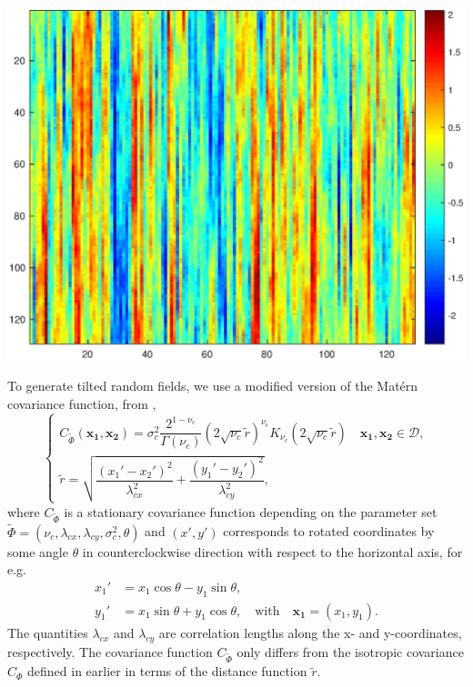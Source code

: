 \documentclass{extarticle}
\begin{document}
\includegraphics[scale=0.4]{f3.eps}\\
\vspace{1cm}

To generate tilted random fields, we use a modified version of the Mat\'ern covariance function, from \cite{kumarTransport},
\begin{equation}\label{aniso}
\begin{cases}
C_{\widetilde{\Phi}}(\mathbf{x_1},\mathbf{x_2}) = \sigma_c^2\dfrac{2^{1-\nu_c}}{\Gamma(\nu_c)}\left( 2\sqrt{\nu_c}\tilde{r}\right)^{\nu_c} K_{\nu_c}\left( 2\sqrt{\nu_c}\tilde{r}\right)\quad \mathbf{x_1},\mathbf{x_2}\in\mathcal{D},\\ 
\tilde{r} = \sqrt{\dfrac{(x_1'-x_2')^2}{\lambda^2_{cx}}+ \dfrac{(y_1'-y_2')^2}{\lambda^2_{cy}}},
\end{cases}
\end{equation}
where $C_{\widetilde{\Phi}}$ is a stationary covariance function depending on the parameter set ${\widetilde{\Phi}} = (\nu_c, \lambda_{cx}, \lambda_{cy}, \sigma_c^2,\theta)$ and $(x',y')$ corresponds to rotated coordinates by some angle $\theta$  in counterclockwise direction with respect to the horizontal axis, for e.g.
\begin{align}
x_1'  &= x_1\cos\theta - y_1\sin\theta,\nonumber\\
y_1'  &= x_1\sin\theta + y_1\cos\theta,\quad\text{with}\quad\mathbf{x_1} = (x_1,y_1)\nonumber.
\end{align}
The quantities $\lambda_{cx}$ and $\lambda_{cy}$ are correlation lengths along the x- and y-coordinates, respectively. The covariance function $C_{\widetilde{\Phi}}$ only differs from the isotropic covariance $C_\Phi$ defined in earlier in terms of the distance function $\tilde{r}$.\\
\vspace{1cm}
\end{document}
